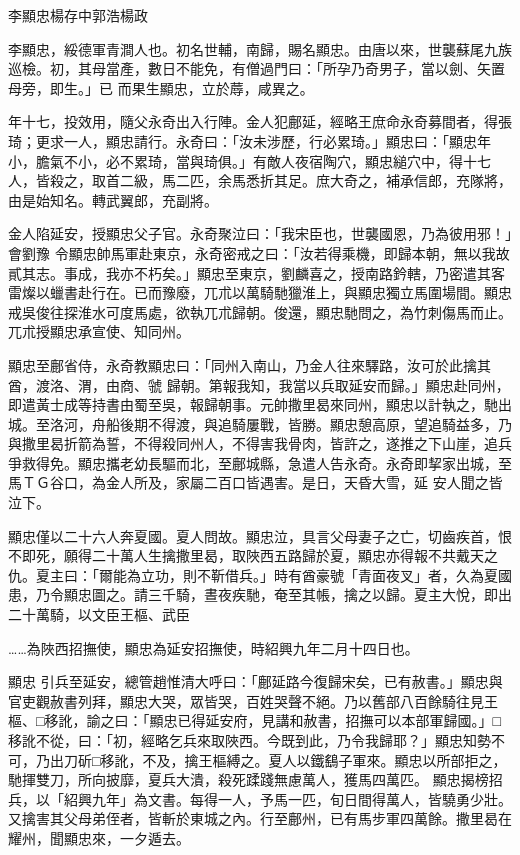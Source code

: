 
\begin{pinyinscope}

 李顯忠楊存中郭浩楊政



 李顯忠，綏德軍青澗人也。初名世輔，南歸，賜名顯忠。由唐以來，世襲蘇尾九族巡檢。初，其母當產，數日不能免，有僧過門曰：「所孕乃奇男子，當以劍、矢置母旁，即生。」已
 而果生顯忠，立於蓐，咸異之。



 年十七，投效用，隨父永奇出入行陣。金人犯鄜延，經略王庶命永奇募間者，得張琦；更求一人，顯忠請行。永奇曰：「汝未涉歷，行必累琦。」顯忠曰：「顯忠年小，膽氣不小，必不累琦，當與琦俱。」有敵人夜宿陶穴，顯忠縋穴中，得十七人，皆殺之，取首二級，馬二匹，余馬悉折其足。庶大奇之，補承信郎，充隊將，由是始知名。轉武翼郎，充副將。



 金人陷延安，授顯忠父子官。永奇聚泣曰：「我宋臣也，世襲國恩，乃為彼用邪！」會劉豫
 令顯忠帥馬軍赴東京，永奇密戒之曰：「汝若得乘機，即歸本朝，無以我故貳其志。事成，我亦不朽矣。」顯忠至東京，劉麟喜之，授南路鈐轄，乃密遣其客雷燦以蠟書赴行在。已而豫廢，兀朮以萬騎馳獵淮上，與顯忠獨立馬圍場間。顯忠戒吳俊往探淮水可度馬處，欲執兀朮歸朝。俊還，顯忠馳問之，為竹刺傷馬而止。兀朮授顯忠承宣使、知同州。



 顯忠至鄜省侍，永奇教顯忠曰：「同州入南山，乃金人往來驛路，汝可於此擒其酋，渡洛、渭，由商、虢
 歸朝。第報我知，我當以兵取延安而歸。」顯忠赴同州，即遣黃士成等持書由蜀至吳，報歸朝事。元帥撒里曷來同州，顯忠以計執之，馳出城。至洛河，舟船後期不得渡，與追騎屢戰，皆勝。顯忠憩高原，望追騎益多，乃與撒里曷折箭為誓，不得殺同州人，不得害我骨肉，皆許之，遂推之下山崖，追兵爭救得免。顯忠攜老幼長驅而北，至鄜城縣，急遣人告永奇。永奇即挈家出城，至馬ＴＧ谷口，為金人所及，家屬二百口皆遇害。是日，天昏大雪，延
 安人聞之皆泣下。



 顯忠僅以二十六人奔夏國。夏人問故。顯忠泣，具言父母妻子之亡，切齒疾首，恨不即死，願得二十萬人生擒撒里曷，取陜西五路歸於夏，顯忠亦得報不共戴天之仇。夏主曰：「爾能為立功，則不靳借兵。」時有酋豪號「青面夜叉」者，久為夏國患，乃令顯忠圖之。請三千騎，晝夜疾馳，奄至其帳，擒之以歸。夏主大悅，即出二十萬騎，以文臣王樞、武臣



 ……為陜西招撫使，顯忠為延安招撫使，時紹興九年二月十四日也。



 顯忠
 引兵至延安，總管趙惟清大呼曰：「鄜延路今復歸宋矣，已有赦書。」顯忠與官吏觀赦書列拜，顯忠大哭，眾皆哭，百姓哭聲不絕。乃以舊部八百餘騎往見王樞、□移訛，諭之曰：「顯忠已得延安府，見講和赦書，招撫可以本部軍歸國。」□移訛不從，曰：「初，經略乞兵來取陜西。今既到此，乃令我歸耶？」顯忠知勢不可，乃出刀斫□移訛，不及，擒王樞縛之。夏人以鐵鷂子軍來。顯忠以所部拒之，馳揮雙刀，所向披靡，夏兵大潰，殺死蹂踐無慮萬人，獲馬四萬匹。
 顯忠揭榜招兵，以「紹興九年」為文書。每得一人，予馬一匹，旬日間得萬人，皆驍勇少壯。又擒害其父母弟侄者，皆斬於東城之內。行至鄜州，已有馬步軍四萬餘。撒里曷在耀州，聞顯忠來，一夕遁去。




\end{pinyinscope}
